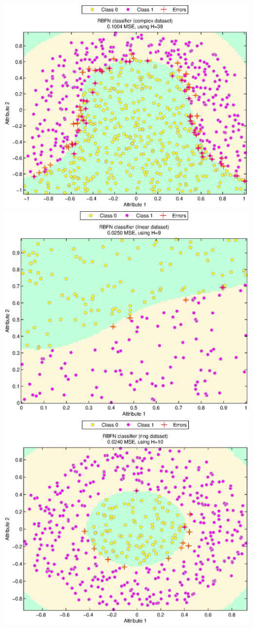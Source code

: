 \documentclass[journal]{IEEEtran}
\begin{document}
\includegraphics[width=\columnwidth]{imagenes/complex}
\clearpage%
\includegraphics[width=\columnwidth]{imagenes/linear}
\clearpage%
\includegraphics[width=\columnwidth]{imagenes/ring}
\end{document}
